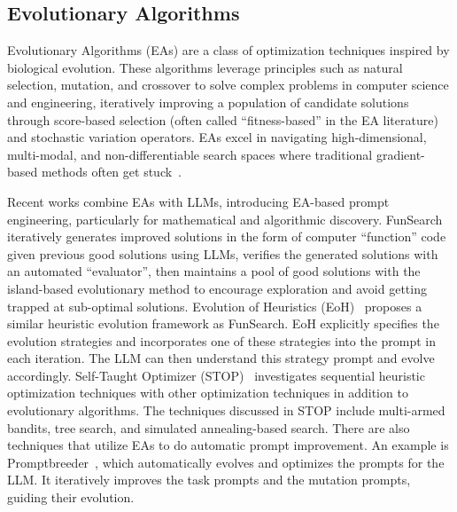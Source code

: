 \subsection{Evolutionary Algorithms}
Evolutionary Algorithms (EAs) are a class of optimization techniques inspired by biological evolution. These algorithms leverage principles such as natural selection, mutation, and crossover to solve complex problems in computer science and engineering, iteratively improving a population of candidate solutions through score-based selection (often called ``fitness-based'' in the EA literature) and stochastic variation operators. 
EAs excel in navigating high-dimensional, multi-modal, and non-differentiable search spaces where traditional gradient-based methods often get stuck~\cite{yu2010introduction,slowik2020evolutionary}. 

Recent works combine EAs with LLMs, introducing EA-based prompt engineering, particularly for mathematical and algorithmic discovery.
FunSearch~\cite{FunSearch} iteratively generates improved solutions in the form of computer ``function'' code given previous good solutions using LLMs, verifies the generated solutions with an automated ``evaluator'', then maintains a pool of good solutions with the island-based evolutionary method to encourage exploration and avoid getting trapped at sub-optimal solutions.
Evolution of Heuristics (EoH)~\cite {liu2024evolution} proposes a similar heuristic evolution framework as FunSearch.  EoH explicitly specifies the evolution strategies and incorporates one of these strategies into the prompt in each iteration. The LLM can then understand this strategy prompt and evolve accordingly. 
Self-Taught Optimizer (STOP)~\cite{zelikman2023self} investigates sequential heuristic optimization techniques with other optimization techniques in addition to evolutionary algorithms. The techniques discussed in STOP include multi-armed bandits, tree search, and simulated annealing-based search. 
There are also techniques that utilize EAs to do automatic prompt improvement. An example is Promptbreeder~\cite{fernando2023promptbreeder}, which automatically evolves and optimizes the prompts for the LLM. 
It iteratively improves the task prompts and the mutation prompts, guiding their evolution.




